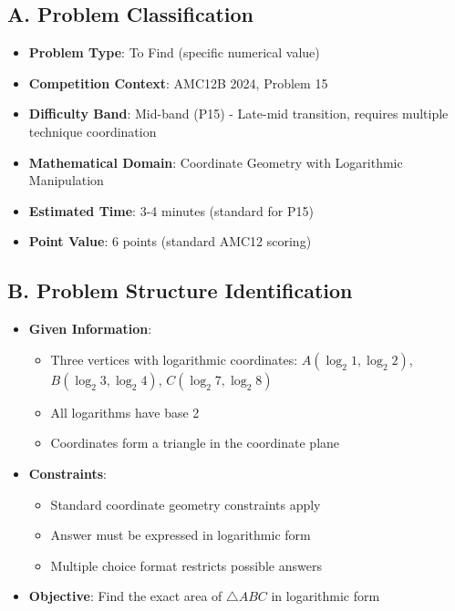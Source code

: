 \documentclass[12pt]{article}
\begin{document}
\begin{problemconfigbox}
\subsection*{A. Problem Classification}
\begin{itemize}[leftmargin=*]
    \item \textbf{Problem Type}: To Find (specific numerical value)
    \item \textbf{Competition Context}: AMC12B 2024, Problem 15
    \item \textbf{Difficulty Band}: Mid-band (P15) - Late-mid transition, requires multiple technique coordination
    \item \textbf{Mathematical Domain}: Coordinate Geometry with Logarithmic Manipulation
    \item \textbf{Estimated Time}: 3-4 minutes (standard for P15)
    \item \textbf{Point Value}: 6 points (standard AMC12 scoring)
\end{itemize}

\subsection*{B. Problem Structure Identification}
\begin{itemize}[leftmargin=*]
    \item \textbf{Given Information}: 
    \begin{itemize}
        \item Three vertices with logarithmic coordinates: $A(\log_2 1, \log_2 2)$, $B(\log_2 3, \log_2 4)$, $C(\log_2 7, \log_2 8)$
        \item All logarithms have base 2
        \item Coordinates form a triangle in the coordinate plane
    \end{itemize}
    
    \item \textbf{Constraints}: 
    \begin{itemize}
        \item Standard coordinate geometry constraints apply
        \item Answer must be expressed in logarithmic form
        \item Multiple choice format restricts possible answers
    \end{itemize}
    
    \item \textbf{Objective}: Find the exact area of $\triangle ABC$ in logarithmic form
    

\end{itemize}
\end{problemconfigbox}
\end{document}
